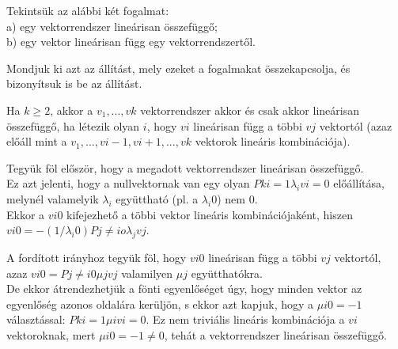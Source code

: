 \begin{frame}
  \begin{tcolorbox}[title={2. (4p)}]
     Tekintsük az alábbi két fogalmat:\\
     a) egy vektorrendszer lineárisan összefüggő;\\
     b) egy vektor lineárisan függ egy vektorrendszertől.\\
     \mmedskip
     
     Mondjuk ki azt az állítást, mely ezeket a fogalmakat összekapcsolja, és bizonyítsuk is be az állítást.
  \tcblower
  
    Ha $k \geq 2$, akkor a $v_1,...,vk$ vektorrendszer akkor és csak akkor lineárisan összefüggő, ha létezik olyan $i$, hogy $vi$ lineárisan függ a többi $vj$ vektortól (azaz előáll mint a $v_1,...,vi-1,vi+1,...,vk$ vektorok lineáris kombinációja).\\
    \mmedskip
    
    Tegyük föl először, hogy a megadott vektorrendszer lineárisan összefüggő.\\
    Ez azt jelenti, hogy a nullvektornak van egy olyan $Pk i=1 {\lambda}_ivi = 0$ előállítása, melynél valamelyik ${\lambda}_i$ együttható (pl. a ${\lambda}_i0$) nem $0$.\\
    
    Ekkor a $vi0$ kifejezhető a többi vektor lineáris kombinációjaként, hiszen $vi0 = -(1/{\lambda}_i0)Pj \neq io {\lambda}_jvj$.\\
    \mmedskip
    
    A fordított irányhoz tegyük föl, hogy $vi0$ lineárisan függ a többi $vj$ vektortól, azaz $vi0 = Pj \neq i0 {\mu}jvj$ valamilyen ${\mu}j$ együtthatókra.\\
    
    De ekkor átrendezhetjük a fönti egyenlőséget úgy, hogy minden vektor az egyenlőség azonos oldalára kerüljön, s ekkor azt kapjuk, hogy a ${\mu}i0 = -1$ választással: $Pk i=1 {\mu}ivi = 0$. Ez nem triviális lineáris kombinációja a $vi$ vektoroknak, mert ${\mu}i0 = -1 \neq 0$, tehát a vektorrendszer lineárisan összefüggő.
  \end{tcolorbox}
\end{frame}


